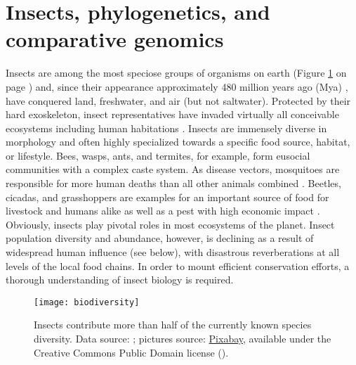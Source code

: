 \section{Insects, phylogenetics, and comparative genomics}

Insects are among the most speciose groups of organisms on earth (Figure
\ref{fig:biodiversity} on page \pageref{fig:biodiversity}) and, since
their appearance approximately 480 million years ago (Mya)
\citep{Misof2014}, have conquered land, freshwater, and air (but not
saltwater).  Protected by their hard exoskeleton, insect representatives
have invaded virtually all conceivable ecosystems including human
habitations \citep{Bertone2016}.  Insects are immensely diverse in
morphology \citep{Grimaldi2005} and often highly specialized towards a
specific food source, habitat, or lifestyle.  Bees, wasps, ants, and
termites, for example, form eusocial communities with a complex caste
system.  As disease vectors, mosquitoes are responsible for more human
deaths than all other animals combined \citep{WHO2017, Linnell2011,
Lamarque2009, DeMaddalena2008, Kasturiratne2008, Packer2005}.  Beetles,
cicadas, and grasshoppers are examples for an important source of food
for livestock and humans alike as well as a pest with high economic
impact \citep{Oliveira2014}.  Obviously, insects play pivotal roles in
most ecosystems of the planet.  Insect population diversity and
abundance, however, is declining \citep{Vogel2017} as a result of
widespread human influence (see below), with disastrous reverberations
at all levels of the local food chains.  In order to mount efficient
conservation efforts, a thorough understanding of insect biology is
required.

\begin{figure}[ht]
\centering
\texttt{[image: biodiversity]}
\caption[Biodiversity by numbers of species]
{Insects contribute more than half of the currently known species
diversity.  Data source: \citet{IUCN2018}; pictures source:
\href{https://pixabay.com}{Pixabay}, available under the Creative
Commons Public Domain license
(\href{https://creativecommons.org/publicdomain/zero/1.0}{\footnotesize{\cczero}}).}
\label{fig:biodiversity}
\end{figure}

